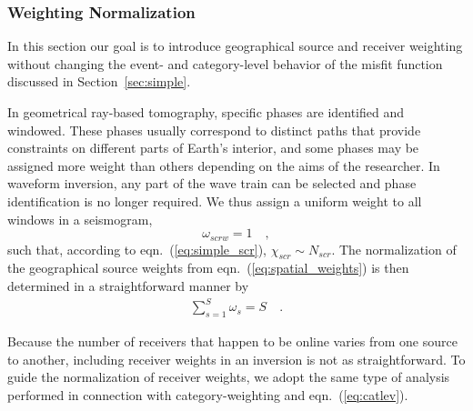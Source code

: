 \subsubsection{Weighting Normalization}
\label{sec:norm}

In this section our goal is to introduce geographical source and receiver weighting without changing the event- and category-level behavior of the misfit function discussed in Section~\ref{sec:simple}.  

In geometrical ray-based tomography, specific phases are identified and windowed. These phases usually correspond to distinct paths that provide constraints 
on different parts of Earth's interior, and some phases may be assigned more weight than others 
depending on the aims of the researcher.
In waveform inversion, any part of the wave train can 
be selected and phase identification is no longer required. We thus assign a uniform weight to all windows in a  seismogram,
\begin{equation}
\label{eq:I_omega_scrw}
\omega_{scrw} = 1
\quad ,
\end{equation}
such that, according to eqn.~(\ref{eq:simple_scr}), $\chi_{scr}\sim N_{scr}$.
The normalization of the geographical source weights from eqn.~(\ref{eq:spatial_weights}) 
is then determined in a straightforward manner by
\begin{align}
\label{eqn:src_norm}
\sum_{s=1}^{S} \omega_{s} = S
\quad .
\end{align}

Because the number of receivers that happen to be online varies from one source to another, including receiver weights in an inversion is not as straightforward.
To guide the normalization of receiver weights, we adopt the same type of analysis performed in connection with category-weighting and eqn.~(\ref{eq:catlev}).

